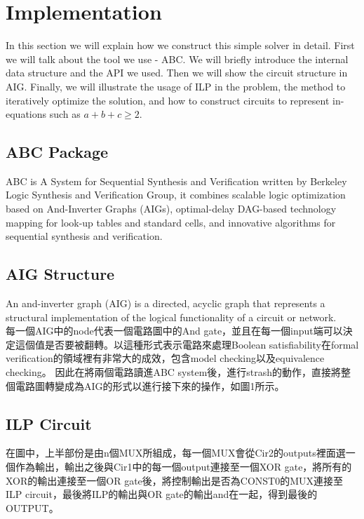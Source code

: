 \section{Implementation}
In this section we will explain how we construct this simple solver in detail. First we will talk about the tool we use - ABC. We will briefly introduce the internal data structure and the API we used. Then we will show the circuit structure in AIG. Finally, we will illustrate the usage of ILP in the problem, the method to iteratively optimize the solution, and how to construct circuits to represent in-equations such as $a+b+c \geq 2$.
\subsection{ABC Package}
ABC is A System for Sequential Synthesis and Verification written by Berkeley Logic Synthesis and Verification Group, it combines scalable logic optimization based on And-Inverter Graphs (AIGs), optimal-delay DAG-based technology mapping for look-up tables and standard cells, and innovative algorithms for sequential synthesis and verification.
\subsection{AIG Structure}
An and-inverter graph (AIG) is a directed, acyclic graph  that represents a structural implementation of the logical functionality of a circuit or network.\\
每一個AIG中的node代表一個電路圖中的And gate，並且在每一個input端可以決定這個值是否要被翻轉。以這種形式表示電路來處理Boolean satisfiability在formal verification的領域裡有非常大的成效，包含model checking以及equivalence checking。
因此在將兩個電路讀進ABC system後，進行strash的動作，直接將整個電路圖轉變成為AIG的形式以進行接下來的操作，如圖1所示。
\subsection{ILP Circuit}
在圖中，上半部份是由n個MUX所組成，每一個MUX會從Cir2的outputs裡面選一個作為輸出，輸出之後與Cir1中的每一個output連接至一個XOR gate，將所有的XOR的輸出連接至一個OR gate後，將控制輸出是否為CONST0的MUX連接至ILP circuit，最後將ILP的輸出與OR gate的輸出and在一起，得到最後的OUTPUT。

